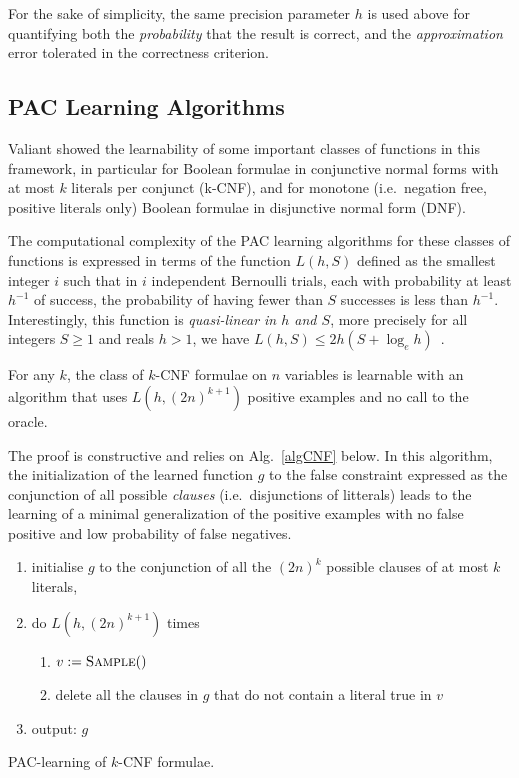 \documentclass{llncs}
\begin{document}
For the sake of simplicity, the same precision parameter $h$ is used above for quantifying both the \emph{probability} that the result is correct,
and the \emph{approximation} error tolerated in the correctness criterion.


\subsection{PAC Learning Algorithms}

Valiant showed the learnability of some important classes of functions in this framework,
in particular for Boolean formulae in conjunctive normal forms with at most $k$ literals per conjunct (k-CNF),
and for monotone (i.e.~negation free, positive literals only) Boolean formulae in disjunctive normal form (DNF).

The computational complexity of the PAC learning algorithms for these classes of functions is expressed in terms of the function
$L(h,S)$ defined as the smallest integer $i$ such that
in $i$ independent Bernoulli trials, each with probability at least $h^{-1}$ of success, the probability of having fewer than $S$ successes is less than $h^{-1}$.
Interestingly, this function is \emph{quasi-linear in $h$ and $S$}, more precisely for all
integers $S\ge 1$ and reals $h>1$, we have $L(h,S) \le 2h(S+\log_e h)$~\cite{Valiant84cacm}.

\begin{theorem}\label{thm:kcnf}
For any $k$, the class of $k$-CNF formulae on $n$ variables is learnable with an
algorithm that uses $L(h,{(2 n)}^{k+1})$ positive examples and no call to the
oracle.
\end{theorem}

The proof is constructive and relies on Alg.~\ref{algCNF} below. In this algorithm, the initialization of the learned function $g$ to the false constraint expressed as the conjunction of all possible \emph{clauses} (i.e.~disjunctions of litterals)
leads to the learning of a minimal generalization of the positive examples with no false positive and low probability of false negatives.

\begin{algorithm}
\begin{enumerate}
  \item initialise $g$ to the conjunction of all the $(2n)^k$ possible clauses of at most $k$ literals,
\item do $L(h,(2n)^{k+1})$ times 
\begin{enumerate}
\item $v:=\textsc{Sample}()$
\item delete all the clauses in $g$ that do not contain a literal true in $v$
\end{enumerate}
\item output: $g$
\end{enumerate}
\caption{PAC-learning of $k$-CNF formulae.\label{algCNF}}
\end{algorithm}
\end{document}
